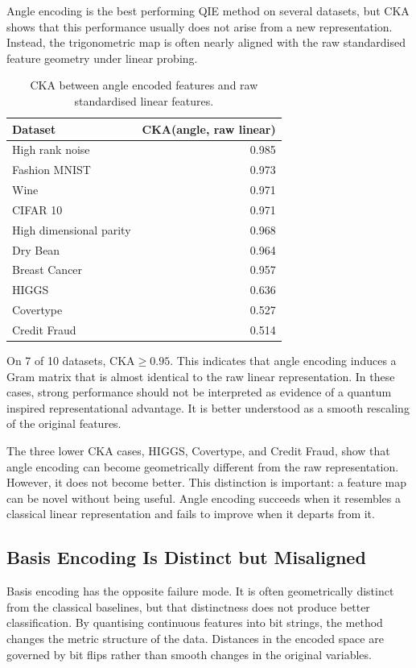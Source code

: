 \documentclass[12pt]{article}
\begin{document}
Angle encoding is the best performing QIE method on several datasets, but CKA
shows that this performance usually does not arise from a new representation.
Instead, the trigonometric map is often nearly aligned with the raw standardised
feature geometry under linear probing.

\begin{table}[tbp]
\centering
\caption{CKA between angle encoded features and raw standardised linear features.}
\label{tab:cka_angle}
\small
\begin{tabular}{lr}
\toprule
Dataset & CKA(angle, raw linear) \\
\midrule
High rank noise & 0.985 \\
Fashion MNIST   & 0.973 \\
Wine            & 0.971 \\
CIFAR 10        & 0.971 \\
High dimensional parity & 0.968 \\
Dry Bean        & 0.964 \\
Breast Cancer   & 0.957 \\
HIGGS           & 0.636 \\
Covertype       & 0.527 \\
Credit Fraud    & 0.514 \\
\bottomrule
\end{tabular}
\end{table}

On 7 of 10 datasets, $\mathrm{CKA}\geq0.95$. This indicates that angle encoding
induces a Gram matrix that is almost identical to the raw linear representation.
In these cases, strong performance should not be interpreted as evidence of a
quantum inspired representational advantage. It is better understood as a smooth
rescaling of the original features.

The three lower CKA cases, HIGGS, Covertype, and Credit Fraud, show that angle
encoding can become geometrically different from the raw representation.
However, it does not become better. This distinction is important: a feature map
can be novel without being useful. Angle encoding succeeds when it resembles a
classical linear representation and fails to improve when it departs from it.

\subsection{Basis Encoding Is Distinct but Misaligned}
\label{sec:basis}

Basis encoding has the opposite failure mode. It is often geometrically distinct
from the classical baselines, but that distinctness does not produce better
classification. By quantising continuous features into bit strings, the method
changes the metric structure of the data. Distances in the encoded space are
governed by bit flips rather than smooth changes in the original variables.
\end{document}
